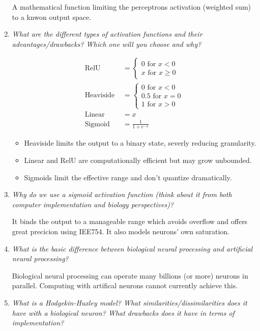\documentclass[
    fontsize      = 11pt,
    paper         = a4,
    twoside       = false,
    parskip       = half,
    pagesize      = false,
]{scrartcl}
\providecommand{\tightlist}{%
  \setlength{\itemsep}{0pt}\setlength{\parskip}{0pt}}
\begin{document}
\begin{enumerate}
  A mathematical function limiting the perceptrons activation (weighted
  sum) to a knwon output space.
\item
  \emph{What are the different types of activation functions and their
  advantages/drawbacks? Which one will you choose and why?}

  \begin{align*}
   \text{RelU } &= \begin{cases} 0 \text{ for } x < 0\\ x \text{ for } x \geq 0\end{cases}\\[2ex]
   \text{Heaviside } &= \begin{cases} 0 \text{ for } x < 0\\ 0.5 \text{ for } x = 0\\ 1 \text{ for } x > 0\end{cases}\\[2ex]
   \text{Linear } &= x\\
   \text{Sigmoid} &= \frac{1}{1+e^{-x}}
   \end{align*}

  \begin{itemize}
  \tightlist
  \item
    Heaviside limits the output to a binary state, severly reducing
    granularity.
  \item
    Linear and RelU are computationally efficient but may grow
    unbounded.
  \item
    Sigmoids limit the effective range and don't quantize dramatically.
  \end{itemize}
\item
  \emph{Why do we use a sigmoid activation function (think about it from
  both computer implementation and biology perspectives)?}

  It binds the output to a manageable range which avoids overflow and
  offers great precicion using IEE754. It also models neurons' own
  saturation.
\item
  \emph{What is the basic difference between biological neural
  processing and artificial neural processing?}

  Biological neural processing can operate many billions (or more)
  neurons in parallel. Computing with artifical neurons cannot currently
  achieve this.
\item
  \emph{What is a Hodgekin-Huxley model? What
  similarities/dissimilarities does it have with a biological neuron?
  What drawbacks does it have in terms of implementation?}


\end{enumerate}
\end{document}

